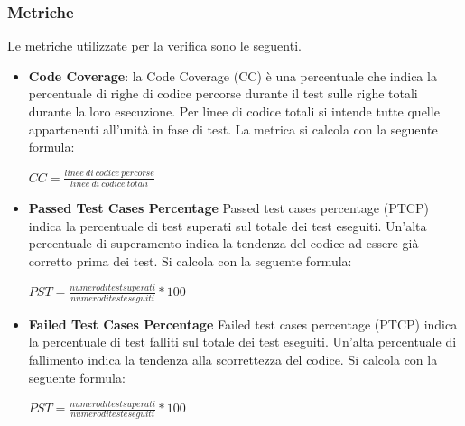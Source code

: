 		
	\subsubsection{Metriche}
	Le metriche utilizzate per la verifica sono le seguenti.
	\begin{itemize}
		\item \textbf{Code Coverage}:
		la Code Coverage (CC) è una percentuale che indica la percentuale di righe di codice percorse durante il test sulle righe totali durante la loro esecuzione. Per linee di codice totali si intende tutte quelle appartenenti all'unità in fase di test. La metrica si calcola con la seguente formula:
		\begin{center}
			$CC = \frac{linee\ di\ codice\ percorse}{linee\ di\ codice\ totali}$
		\end{center}
		\item \textbf{Passed Test Cases Percentage}
		Passed test cases percentage (PTCP) indica la percentuale di test superati sul totale dei test eseguiti. Un'alta percentuale di superamento indica la tendenza del codice ad essere già corretto prima dei test. Si calcola con la seguente formula:
		\begin{center}
			$ PST = \frac{numero di test superati}{numero di test eseguiti} * 100$
		\end{center}
		\item \textbf{Failed Test Cases Percentage}
		Failed test cases percentage (PTCP) indica la percentuale di test falliti sul totale dei test eseguiti. Un'alta percentuale di fallimento indica la tendenza alla scorrettezza del codice. Si calcola con la seguente formula:
		\begin{center}
			$ PST = \frac{numero di test superati}{numero di test eseguiti} * 100$
		\end{center}
	\end{itemize}

